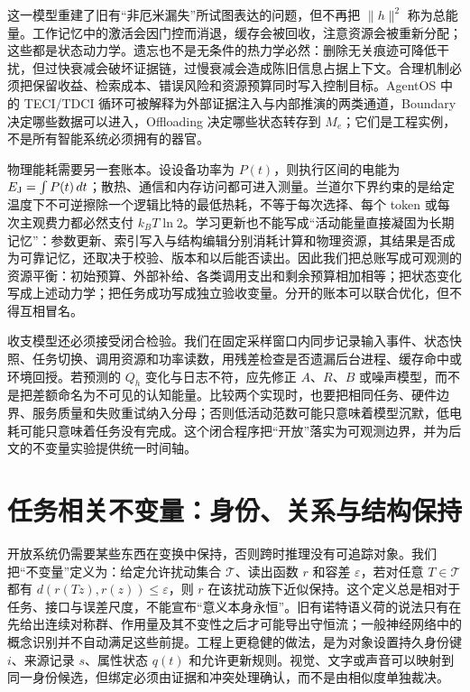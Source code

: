 这一模型重建了旧有“非厄米漏失”所试图表达的问题，但不再把 $\|h\|^2$ 称为总能量。工作记忆中的激活会因门控而消退，缓存会被回收，注意资源会被重新分配；这些都是状态动力学。遗忘也不是无条件的热力学必然：删除无关痕迹可降低干扰，但过快衰减会破坏证据链，过慢衰减会造成陈旧信息占据上下文。合理机制必须把保留收益、检索成本、错误风险和资源预算同时写入控制目标。AgentOS 中的 TECI/TDCI 循环可被解释为外部证据注入与内部推演的两类通道，Boundary 决定哪些数据可以进入，Offloading 决定哪些状态转存到 $M_e$；它们是工程实例，不是所有智能系统必须拥有的器官。

物理能耗需要另一套账本。设设备功率为 $P(t)$，则执行区间的电能为 $E_{\rm J}=\int P(t)\,dt$；散热、通信和内存访问都可进入测量。兰道尔下界约束的是给定温度下不可逆擦除一个逻辑比特的最低热耗，不等于每次选择、每个 token 或每次主观费力都必然支付 $k_BT\ln2$。学习更新也不能写成“活动能量直接凝固为长期记忆”：参数更新、索引写入与结构编辑分别消耗计算和物理资源，其结果是否成为可靠记忆，还取决于校验、版本和以后能否读出。因此我们把总账写成可观测的资源平衡：初始预算、外部补给、各类调用支出和剩余预算相加相等；把状态变化写成上述动力学；把任务成功写成独立验收变量。分开的账本可以联合优化，但不得互相冒名。

收支模型还必须接受闭合检验。我们在固定采样窗口内同步记录输入事件、状态快照、任务切换、调用资源和功率读数，用残差检查是否遗漏后台进程、缓存命中或环境回授。若预测的 $Q_h$ 变化与日志不符，应先修正 $A$、$R$、$B$ 或噪声模型，而不是把差额命名为不可见的认知能量。比较两个实现时，也要把相同任务、硬件边界、服务质量和失败重试纳入分母；否则低活动范数可能只意味着模型沉默，低电耗可能只意味着任务没有完成。这个闭合程序把“开放”落实为可观测边界，并为后文的不变量实验提供统一时间轴。

\section{任务相关不变量：身份、关系与结构保持}
\label{sec:eternity_of_meaning_geometric_conservation_laws}

开放系统仍需要某些东西在变换中保持，否则跨时推理没有可追踪对象。我们把“不变量”定义为：给定允许扰动集合 $\mathcal{T}$、读出函数 $r$ 和容差 $\varepsilon$，若对任意 $T\in\mathcal{T}$ 都有 $d(r(Tz),r(z))\leq\varepsilon$，则 $r$ 在该扰动族下近似保持。这个定义总是相对于任务、接口与误差尺度，不能宣布“意义本身永恒”。旧有诺特语义荷的说法只有在先给出连续对称群、作用量及其不变性之后才可能导出守恒流；一般神经网络中的概念识别并不自动满足这些前提。工程上更稳健的做法，是为对象设置持久身份键 $i$、来源记录 $s$、属性状态 $q(t)$ 和允许更新规则。视觉、文字或声音可以映射到同一身份候选，但绑定必须由证据和冲突处理确认，而不是由相似度单独裁决。

